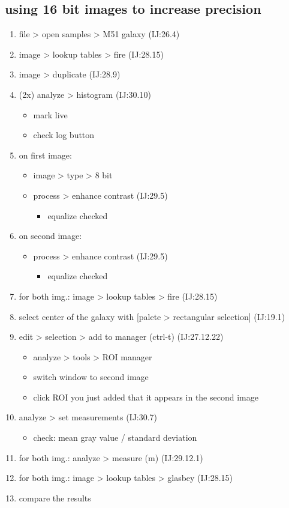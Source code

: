\documentclass[11pt]{article}
\begin{document}
\subsection{using 16 bit images to increase precision}
\label{sec-1-10}
\begin{enumerate}
\item file > open samples > M51 galaxy (IJ:26.4)
\item image > lookup tables > fire (IJ:28.15)
\item image > duplicate (IJ:28.9)
\item (2x) analyze > histogram (IJ:30.10)
\begin{itemize}
\item mark live
\item check log button
\end{itemize}
\item on first image:
\begin{itemize}
\item image > type > 8 bit
\item process > enhance contrast (IJ:29.5)
\begin{itemize}
\item equalize checked
\end{itemize}
\end{itemize}
\item on second image:
\begin{itemize}
\item process > enhance contrast (IJ:29.5)
\begin{itemize}
\item equalize checked
\end{itemize}
\end{itemize}
\item for both img.: image > lookup tables > fire (IJ:28.15)
\item select center of the galaxy with [palete > rectangular
selection] (IJ:19.1)
\item edit > selection > add to manager (ctrl-t) (IJ:27.12.22)
\begin{itemize}
\item analyze > tools > ROI manager
\item switch window to second image
\item click ROI you just added that it appears in the second image
\end{itemize}
\item analyze > set measurements (IJ:30.7)
\begin{itemize}
\item check: mean gray value / standard deviation
\end{itemize}
\item for both img.: analyze > measure (m) (IJ:29.12.1)
\item for both img.: image > lookup tables > glasbey (IJ:28.15)
\item compare the results
\end{enumerate}
\end{document}
